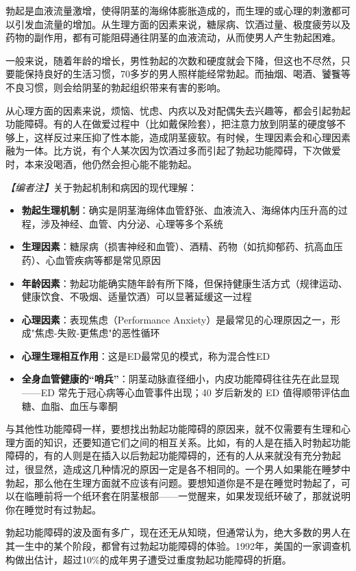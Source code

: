 \documentclass[12pt,a4paper,twoside]{ctexbook}
\begin{document}
勃起是血液流量激增，使得阴茎的海绵体膨胀造成的，而生理的或心理的刺激都可以引发血流量的增加。从生理方面的因素来说，糖尿病、饮酒过量、极度疲劳以及药物的副作用，都有可能阻碍通往阴茎的血液流动，从而使男人产生勃起困难。

一般来说，随着年龄的增长，男性勃起的次数和硬度就会下降，但这也不尽然，只要能保持良好的生活习惯，70多岁的男人照样能经常勃起。而抽烟、喝酒、饕餮等不良习惯，则会给阴茎的勃起组织带来有害的影响。

从心理方面的因素来说，烦恼、忧虑、内疚以及对配偶失去兴趣等，都会引起勃起功能障碍。有的人在做爱过程中（比如戴保险套），把注意力放到阴茎的硬度够不够上，这样反过来压抑了性本能，造成阴茎疲软。有时候，生理因素会和心理因素融为一体。比方说，有个人某次因为饮酒过多而引起了勃起功能障碍，下次做爱时，本来没喝酒，他仍然会担心能不能勃起。

\noindent\textit{【编者注】}关于勃起机制和病因的现代理解：
\begin{itemize}
	\item \textbf{勃起生理机制}：确实是阴茎海绵体血管舒张、血液流入、海绵体内压升高的过程，涉及神经、血管、内分泌、心理等多个系统
	\item \textbf{生理因素}：糖尿病（损害神经和血管）、酒精、药物（如抗抑郁药、抗高血压药）、心血管疾病等都是常见原因
	\item \textbf{年龄因素}：勃起功能确实随年龄有所下降，但保持健康生活方式（规律运动、健康饮食、不吸烟、适量饮酒）可以显著延缓这一过程
	\item \textbf{心理因素}：表现焦虑（Performance Anxiety）是最常见的心理原因之一，形成"焦虑-失败-更焦虑"的恶性循环
	\item \textbf{心理生理相互作用}：这是ED最常见的模式，称为混合性ED
	\item \textbf{全身血管健康的“哨兵”}：阴茎动脉直径细小，内皮功能障碍往往先在此显现——ED 常先于冠心病等心血管事件出现；40 岁后新发的 ED 值得顺带评估血糖、血脂、血压与睾酮
\end{itemize}

与其他性功能障碍一样，要想找出勃起功能障碍的原因来，就不仅需要有生理和心理方面的知识，还要知道它们之间的相互关系。比如，有的人是在插入时勃起功能障碍的，有的人则是在插入以后勃起功能障碍的，还有的人从来就没有充分勃起过，很显然，造成这几种情况的原因一定是各不相同的。一个男人如果能在睡梦中勃起，那么他在生理方面就不应该有问题。要想知道你是不是在睡觉时勃起了，可以在临睡前将一个纸环套在阴茎根部——一觉醒来，如果发现纸环破了，那就说明你在睡觉时有过勃起。

勃起功能障碍的波及面有多广，现在还无从知晓，但通常认为，绝大多数的男人在其一生中的某个阶段，都曾有过勃起功能障碍的体验。1992年，美国的一家调查机构做出估计，超过10\%的成年男子遭受过重度勃起功能障碍的折磨。
\end{document}
